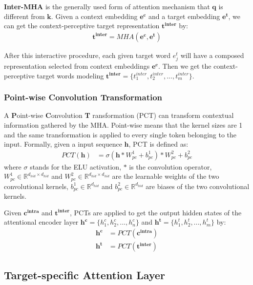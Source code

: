 \documentclass[11pt,a4paper]{article}
\begin{document}
\textbf{Inter-MHA} is the generally used form of attention mechanism that $\mathbf{q}$ is different from $\mathbf{k}$.
Given a context embedding $\mathbf{e^c}$ and a target embedding $\mathbf{e^t}$,
we can get the context-perceptive target representation $\mathbf{t^{inter}}$ by:
\begin{align}
\mathbf{t^{inter}} = MHA(\mathbf{e^c}, \mathbf{e^t})
\end{align}

After this interactive procedure,
each given target word $e_j^t$ will have a composed representation selected from context embeddings $\mathbf{e^{c}}$.
Then we get the context-perceptive target words modeling $\mathbf{t^{inter}}=\{t_1^{inter}, t_2^{inter}, ..., t_m^{inter}\}$.

\subsubsection{Point-wise Convolution Transformation} \label{sec:PCT}

A \textbf{P}oint-wise \textbf{C}onvolution \textbf{T}
ransformation (PCT)
can transform contextual information gathered by the MHA.
Point-wise means that the kernel sizes are 1 and
the same transformation is applied to every single token belonging to the input.
Formally, given a input sequence $\mathbf{h}$, PCT is defined as:
\begin{align}
PCT(\mathbf{h}) &= \sigma(\mathbf{h} * W_{pc}^1 + b_{pc}^1) * W_{pc}^2 + b_{pc}^2
\end{align}
where $\sigma$ stands for the ELU activation,
$*$ is the convolution operator,
$W_{pc}^1 \in \mathbb{R}^{d_{hid} \times d_{hid}}$ and $W_{pc}^2 \in \mathbb{R}^{d_{hid} \times d_{hid}}$
are the learnable weights of the two convolutional kernels,
$b_{pc}^1 \in \mathbb{R}^{d_{hid}}$ and $b_{pc}^2 \in \mathbb{R}^{d_{hid}}$
are biases of the two convolutional kernels.

Given $\mathbf{c^{intra}}$ and $\mathbf{t^{inter}}$,
PCTs are applied to get the output hidden states of the attentional encoder layer
$\mathbf{h^c}=\{h_1^c, h_2^c, ..., h_n^c\}$
and $\mathbf{h^t}=\{h_1^t, h_2^t, ..., h_m^t\}$
by:
\begin{align}
\mathbf{h^c} &= PCT(\mathbf{c^{intra}}) \\
\mathbf{h^t} &= PCT(\mathbf{t^{inter}})
\end{align}



\subsection{Target-specific Attention Layer}
\end{document}
